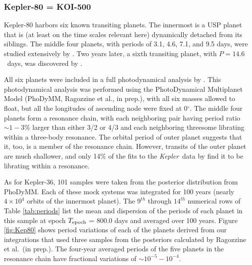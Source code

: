 \documentclass{aastex62}
\newcommand{\ik}{{\it Kepler~}}
\begin{document}
\subsubsection{Kepler-80 = KOI-500}
Kepler-80 harbors six known transiting planets. 
The innermost is a USP planet that is (at least on the time scales relevant here) dynamically detached from its siblings. The middle four planets, with periods of 3.1, 4.6, 7.1, and 9.5 days, were studied extensively by \cite{MacDonald:2016}. Two years later, a sixth transiting planet, with $P = 14.6$~days,
 was discovered by \cite{Shallue:2018}.
 
 All six planets were included in a full photodynamical analysis by \citet{MacDonald:2021}. This photodynamical analysis was performed using the PhotoDynamical Multiplanet Model (PhoDyMM, Ragozzine et al., in prep.), with all six masses allowed to float, but all the longitudes of ascending node were fixed at 0$^{\circ}$. The middle four planets form a resonance chain, with each neighboring pair having  period ratio $\sim 1 - 3$\% larger than either 3/2 or 4/3 and each neighboring threesome librating within a three-body resonance. The orbital period of outer planet suggests that it, too, is a member of the resonance chain. 
However, transits of the outer planet are much shallower, and only 14\% of
the fits to the \ik data by \citet{MacDonald:2021} find it to be
 librating within a resonance.
 

As for Kepler-36,
101 samples were taken from the posterior distribution from PhoDyMM. Each of these mock systems was integrated for 100 years (nearly $4\times10^4$ orbits of the innermost planet). The $9^{th}$ through $14^{th}$ numerical rows of
Table \ref{tab:periods} list the mean and dispersion of the periods of each planet in this sample at epoch $T_{\rm epoch}$ = 800.0 days and averaged over 100 years. Figure \ref{fig:Kep80} shows period variations of each of the planets derived from our integrations that used three samples from the posteriors calculated by Ragozzine et al.~(in prep.). The four-year averaged periods of the five planets in the resonance chain have fractional variations of $\sim 10^{-5} - 10^{-4}$.
\end{document}
